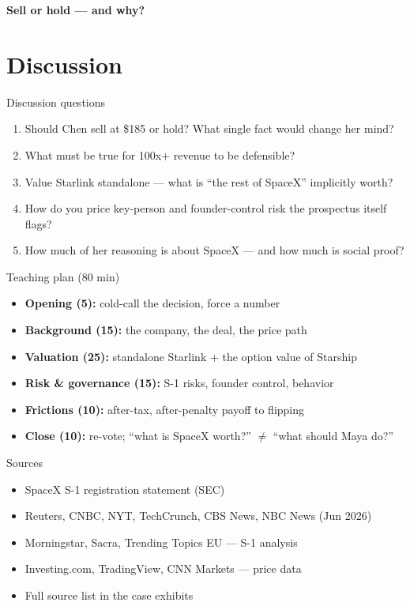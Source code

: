 \documentclass[aspectratio=169,11pt]{beamer}
\begin{document}
\begin{frame}{}
  \vfill
  \begin{center}
    {\Huge\bfseries\color{accent} Sell or hold --- and why?}
  \end{center}
  \vfill
\end{frame}

\section{Discussion}

\begin{frame}{Discussion questions}
  \begin{enumerate}
    \item Should Chen sell at \$185 or hold? What single fact would change her mind?
    \item What must be true for 100x+ revenue to be defensible?
    \item Value Starlink standalone --- what is ``the rest of SpaceX'' implicitly worth?
    \item How do you price key-person and founder-control risk the prospectus itself flags?
    \item How much of her reasoning is about SpaceX --- and how much is social proof?
  \end{enumerate}
\end{frame}

\begin{frame}{Teaching plan (80 min)}
  \begin{itemize}
    \item \textbf{Opening (5):} cold-call the decision, force a number
    \item \textbf{Background (15):} the company, the deal, the price path
    \item \textbf{Valuation (25):} standalone Starlink + the option value of Starship
    \item \textbf{Risk \& governance (15):} S-1 risks, founder control, behavior
    \item \textbf{Frictions (10):} after-tax, after-penalty payoff to flipping
    \item \textbf{Close (10):} re-vote; ``what is SpaceX worth?'' $\neq$ ``what should Maya do?''
  \end{itemize}
\end{frame}

\appendix

\begin{frame}{Sources}
  \footnotesize
  \begin{itemize}
    \item SpaceX S-1 registration statement (SEC)
    \item Reuters, CNBC, NYT, TechCrunch, CBS News, NBC News (Jun 2026)
    \item Morningstar, Sacra, Trending Topics EU --- S-1 analysis
    \item Investing.com, TradingView, CNN Markets --- price data
    \item Full source list in the case exhibits
  \end{itemize}
\end{frame}
\end{document}
